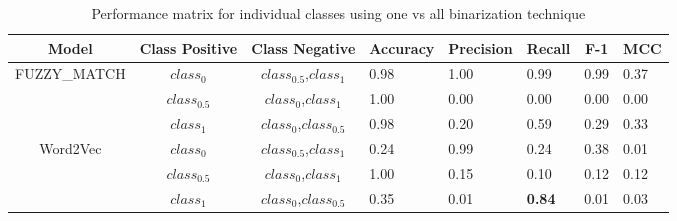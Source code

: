 \documentclass{ieeeaccess}
\begin{document}
\begin{table}[h!]
	\centering
	\caption{Performance matrix for individual classes using one vs all binarization technique}
	\label{tab:evaluations}
	\begin{tabular}{|c|c|c|l|l|l|l|l|}
		\hline
		\textbf{Model}                                        & \textbf{Class Positive} & \textbf{Class Negative} & \multicolumn{1}{c|}{\textbf{Accuracy}} & \multicolumn{1}{c|}{\textbf{Precision}} & \multicolumn{1}{c|}{\textbf{Recall}} & \multicolumn{1}{c|}{\textbf{F-1}} & \multicolumn{1}{c|}{\textbf{MCC}} \\ \hline
		\multirow{3}{*}{FUZZY\_MATCH}                         & $class_0$                     & $class_{0.5}$,$class_1$                   & 0.98                                   & 1.00                                    & 0.99                                 & 0.99                              & 0.37                              \\ \cline{2-8} 
		& $class_{0.5}$                     & $class_0$,$class_1$                   & 1.00                                   & 0.00                                    & 0.00                                 & 0.00                              & 0.00                              \\ \cline{2-8} 
		& $class_1$                       & $class_0$,$class_{0.5}$                 & 0.98                                   & 0.20                                    & 0.59                                 & 0.29                              & 0.33                              \\ \hline
		\multirow{3}{*}{Word2Vec}                             & $class_0$                     & $class_{0.5}$,$class_1$                   & 0.24                                   & 0.99                                    & 0.24                                 & 0.38                              & 0.01                              \\ \cline{2-8} 
		& $class_{0.5}$                     & $class_0$,$class_1$                   & 1.00                                   & 0.15                                    & 0.10                                 & 0.12                              & 0.12                              \\ \cline{2-8} 
		& $class_1$                       & $class_0$,$class_{0.5}$                 & 0.35                                   & 0.01                                    & \textbf{0.84}                        & 0.01                              & 0.03                              \\ \hline

\end{tabular}
\end{table}
\end{document}
